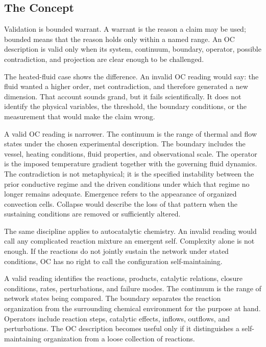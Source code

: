 \documentclass[11pt,a4paper,openany]{book}
\begin{document}
\subsection{The Concept}
Validation is bounded warrant. A warrant is the reason a claim may be used; bounded means that the reason holds only within a named range. An OC description is valid only when its system, continuum, boundary, operator, possible contradiction, and projection are clear enough to be challenged. \cite{prigogine_dissipative,haken_synergetics}\par
The heated-fluid case shows the difference. An invalid OC reading would say: the fluid wanted a higher order, met contradiction, and therefore generated a new dimension. That account sounds grand, but it fails scientifically. It does not identify the physical variables, the threshold, the boundary conditions, or the measurement that would make the claim wrong.\par
A valid OC reading is narrower. The continuum is the range of thermal and flow states under the chosen experimental description. The boundary includes the vessel, heating conditions, fluid properties, and observational scale. The operator is the imposed temperature gradient together with the governing fluid dynamics. The contradiction is not metaphysical; it is the specified instability between the prior conductive regime and the driven conditions under which that regime no longer remains adequate. Emergence refers to the appearance of organized convection cells. Collapse would describe the loss of that pattern when the sustaining conditions are removed or sufficiently altered.\par
The same discipline applies to autocatalytic chemistry. An invalid reading would call any complicated reaction mixture an emergent self. Complexity alone is not enough. If the reactions do not jointly sustain the network under stated conditions, OC has no right to call the configuration self-maintaining.\par
A valid reading identifies the reactions, products, catalytic relations, closure conditions, rates, perturbations, and failure modes. The continuum is the range of network states being compared. The boundary separates the reaction organization from the surrounding chemical environment for the purpose at hand. Operators include reaction steps, catalytic effects, inflows, outflows, and perturbations. The OC description becomes useful only if it distinguishes a self-maintaining organization from a loose collection of reactions.\par
\end{document}
